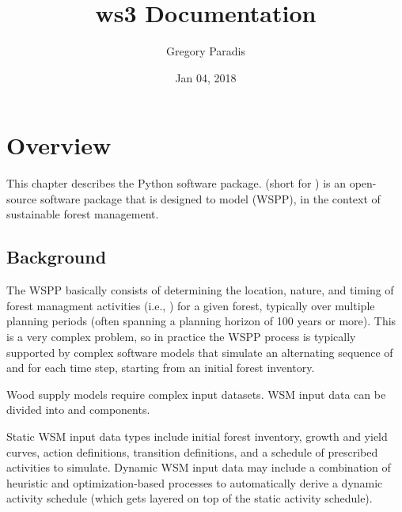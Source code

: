 \documentclass[letterpaper,10pt,english]{sphinxmanual}
\title{ws3 Documentation}
\date{Jan 04, 2018}
\author{Gregory Paradis}
\begin{document}
\maketitle
\sphinxtableofcontents
{}\label{\detokenize{index::doc}}



\chapter{Overview}
\label{\detokenize{intro:ws3-package-documentation}}\label{\detokenize{intro:overview}}\label{\detokenize{intro::doc}}
This chapter describes the  Python software package.  (short for ) is an open-source software package that is designed to model  (WSPP), in the context of sustainable forest management.


\section{Background}
\label{\detokenize{intro:background}}
The WSPP basically consists of determining the location, nature, and timing of forest managment activities (i.e., ) for a given forest, typically over multiple planning periods (often spanning a planning horizon of 100 years or more). This is a very complex problem, so in practice the WSPP process is typically supported by complex software models that simulate an alternating sequence of  and  for each time step, starting from an initial forest inventory.

Wood supply models require complex input datasets. WSM input data can be divided into  and  components.

Static WSM input data types include initial forest inventory, growth and yield curves, action definitions, transition definitions, and a schedule of prescribed activities to simulate.
Dynamic WSM input data may include a combination of heuristic and optimization-based processes to automatically derive a dynamic activity schedule (which gets layered on top of the static activity schedule).
\end{document}
